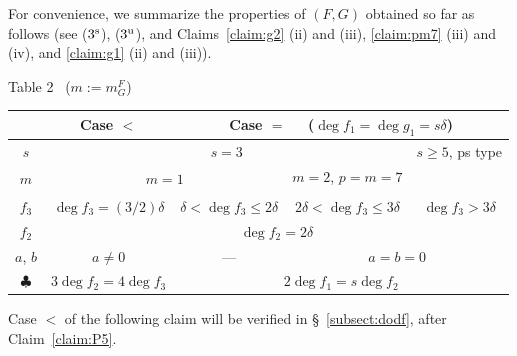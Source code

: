 \documentclass{amsart}
\theoremstyle{plain}
\theoremstyle{definition}
\begin{document}
For convenience, we summarize 
the properties of $(F,G)$ obtained so far as follows 
(see ($3^{\rm s}$), ($3^{\rm u}$), and 
Claims~\ref{claim:g2} (ii) and (iii), 
\ref{claim:pm7} (iii) and (iv), 
and \ref{claim:g1} (ii) and (iii)). 


\begin{center}
Table 2 \ ($m:=m_G^F$)

\begin{tabular}{|c||cccc|}
\hline
 & \multicolumn{1}{|c|}{Case $<$} & 
\multicolumn{3}{|c|}{Case $=$ \ \ ($\deg f_1=\deg g_1=s\delta $)} \\ \hline
\hline
$s$ & \multicolumn{3}{|c|}{$s=3$} & \multicolumn{1}{|c|}{$s\ge 5$, 
ps type} \\ \hline
\multirow{2}{*}{$m$} & 
\multicolumn{2}{c}{\multirow{2}{*}{$m=1$}}& 
\multicolumn{1}{|c|}{$m=2$, $p=m=7$} &  \\  \cline{4-4} \vspace{-1.5mm}
& \multicolumn{4}{|c|}{} \\ \hline 
$f_3$ & 
\multicolumn{1}{|c|}{$\deg f_3=(3/2)\delta $} & 
\multicolumn{1}{|c|}{$\delta <\deg f_3\le 2\delta $} & 
\multicolumn{1}{|c|}{$2\delta <\deg f_3\le 3\delta $} & 
\multicolumn{1}{|c|}{$\deg f_3>3\delta $} \\ \hline 
$f_2$ & \multicolumn{4}{|c|}{$\deg f_2=2\delta $} 
\\ \hline
$a$, $b$ & $a\ne 0$ & 
\multicolumn{1}{|c|}{---} &
\multicolumn{2}{|c|}{$a=b=0$} \\ \hline 
$\clubsuit $ & $3\deg f_2=4\deg f_3$ & 
\multicolumn{3}{|c|}{$2\deg f_1=s\deg f_2$} \\ \hline 
\end{tabular}

\end{center}


\medskip 


Case $<$ of the following claim will be verified in \S ~\ref{subsect:dodf}, 
after Claim~\ref{claim:P5}. 
\end{document}
